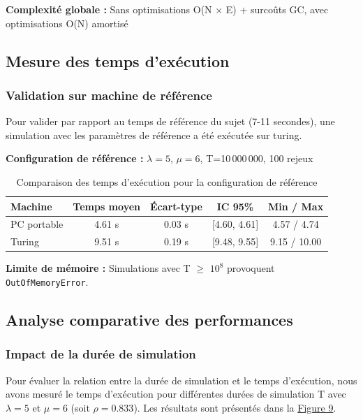 \documentclass[12pt,a4paper]{article}
\begin{document}
\vspace{0.3cm}

\textbf{Complexité globale :} Sans optimisations O(N × E) + surcoûts GC, avec optimisations O(N) amortisé

\subsection{Mesure des temps d'exécution}

\subsubsection{Validation sur machine de référence}\label{sec:validation_turing}

Pour valider par rapport au temps de référence du sujet (7-11 secondes), une simulation avec les paramètres de référence a été exécutée sur turing.

\textbf{Configuration de référence :} $\lambda=5$, $\mu=6$, T=10\,000\,000, 100 rejeux

\begin{table}[H]
\centering
\begin{tabular}{lcccc}
\toprule
\textbf{Machine} & \textbf{Temps moyen} & \textbf{Écart-type} & \textbf{IC 95\%} & \textbf{Min / Max} \\
\midrule
PC portable & 4.61 s & 0.03 s & [4.60, 4.61] & 4.57 / 4.74 \\
Turing & 9.51 s & 0.19 s & [9.48, 9.55] & 9.15 / 10.00 \\
\bottomrule
\end{tabular}
\caption{Comparaison des temps d'exécution pour la configuration de référence}
\label{tab:perf_comparison}
\end{table}

\textbf{Limite de mémoire :} Simulations avec T $\geq$ $10^8$ provoquent \texttt{OutOfMemoryError}.

\subsection{Analyse comparative des performances}

\subsubsection{Impact de la durée de simulation}\label{sec:analyse_performances}

Pour évaluer la relation entre la durée de simulation et le temps d'exécution, nous avons mesuré le temps d'exécution pour différentes durées de simulation T avec $\lambda=5$ et $\mu=6$ (soit $\rho=0.833$). Les résultats sont présentés dans la \hyperref[fig:exec_time]{Figure 9}.
\end{document}
